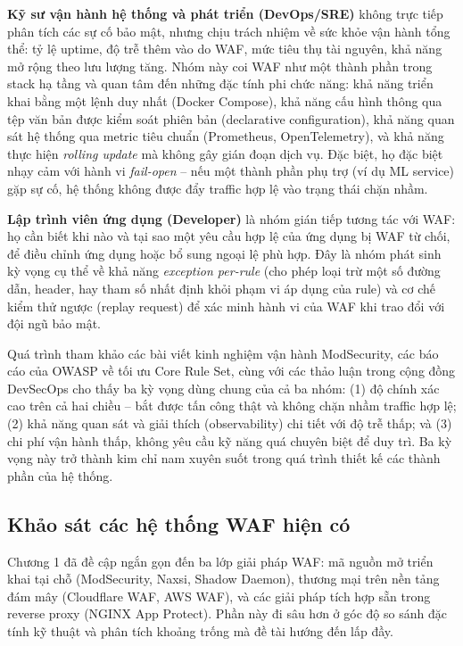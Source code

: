 \documentclass[../DoAn.tex]{subfiles}
\begin{document}
\textbf{Kỹ sư vận hành hệ thống và phát triển (DevOps/SRE)} không trực tiếp
phân tích các sự cố bảo mật, nhưng chịu trách nhiệm về sức khỏe vận hành tổng
thể: tỷ lệ uptime, độ trễ thêm vào do WAF, mức tiêu thụ tài nguyên, khả năng
mở rộng theo lưu lượng tăng. Nhóm này coi WAF như một thành phần trong stack
hạ tầng và quan tâm đến những đặc tính phi chức năng: khả năng triển khai bằng
một lệnh duy nhất (Docker Compose), khả năng cấu hình thông qua tệp văn bản
được kiểm soát phiên bản (declarative configuration), khả năng quan sát hệ
thống qua metric tiêu chuẩn (Prometheus, OpenTelemetry), và khả năng thực hiện
\textit{rolling update} mà không gây gián đoạn dịch vụ. Đặc biệt, họ đặc biệt
nhạy cảm với hành vi \textit{fail-open} -- nếu một thành phần phụ trợ (ví dụ
ML service) gặp sự cố, hệ thống không được đẩy traffic hợp lệ vào trạng thái
chặn nhầm.

\textbf{Lập trình viên ứng dụng (Developer)} là nhóm gián tiếp tương tác với
WAF: họ cần biết khi nào và tại sao một yêu cầu hợp lệ của ứng dụng bị WAF từ
chối, để điều chỉnh ứng dụng hoặc bổ sung ngoại lệ phù hợp. Đây là nhóm phát
sinh kỳ vọng cụ thể về khả năng \textit{exception per-rule} (cho phép loại trừ
một số đường dẫn, header, hay tham số nhất định khỏi phạm vi áp dụng của rule)
và cơ chế kiểm thử ngược (replay request) để xác minh hành vi của WAF khi
trao đổi với đội ngũ bảo mật.

Quá trình tham khảo các bài viết kinh nghiệm vận hành ModSecurity, các báo cáo
của OWASP về tối ưu Core Rule Set, cùng với các thảo luận trong cộng đồng
DevSecOps cho thấy ba kỳ vọng dùng chung của cả ba nhóm: (1) độ chính xác cao
trên cả hai chiều -- bắt được tấn công thật và không chặn nhầm traffic hợp lệ;
(2) khả năng quan sát và giải thích (observability) chi tiết với độ trễ thấp;
và (3) chi phí vận hành thấp, không yêu cầu kỹ năng quá chuyên biệt để duy trì.
Ba kỳ vọng này trở thành kim chỉ nam xuyên suốt trong quá trình thiết kế các
thành phần của hệ thống.

\subsection{Khảo sát các hệ thống WAF hiện có}
\label{subsection:2.1.2}

Chương 1 đã đề cập ngắn gọn đến ba lớp giải pháp WAF: mã nguồn mở triển khai
tại chỗ (ModSecurity, Naxsi, Shadow Daemon), thương mại trên nền tảng đám mây
(Cloudflare WAF, AWS WAF), và các giải pháp tích hợp sẵn trong reverse proxy
(NGINX App Protect). Phần này đi sâu hơn ở góc độ so sánh đặc tính kỹ thuật và
phân tích khoảng trống mà đề tài hướng đến lấp đầy.
\end{document}
